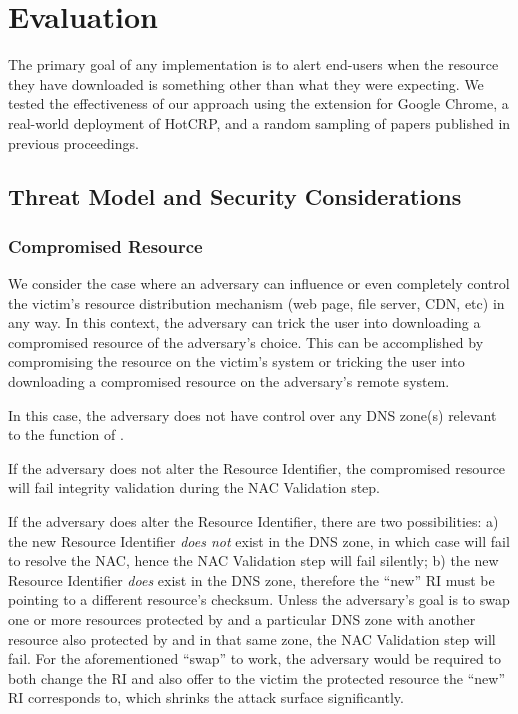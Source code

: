 \section{Evaluation} \label{sec:evaluation}

The primary goal of any \SYSTEM{} implementation is to alert end-users when the
resource they have downloaded is something other than what they were expecting.
We tested the effectiveness of our approach using the \SYSTEM{} extension for
Google Chrome, a real-world deployment of HotCRP, and a random sampling of
papers published in previous \CONFERENCE{} proceedings.

\subsection{Threat Model and Security Considerations}

\subsubsection{Compromised Resource}

We consider the case where an adversary can influence or even completely control
the victim's resource distribution mechanism (web page, file server, CDN, etc)
in any way. In this context, the adversary can trick the user into downloading a
compromised resource of the adversary's choice. This can be accomplished by
compromising the resource on the victim's system or tricking the user into
downloading a compromised resource on the adversary's remote system.

In this case, the adversary does not have control over any DNS zone(s) relevant
to the function of \SYSTEM{}.

If the adversary does not alter the Resource Identifier, the compromised
resource will fail integrity validation during the NAC Validation step.

If the adversary does alter the Resource Identifier, there are two
possibilities: a) the new Resource Identifier \textit{does not} exist in the DNS
zone, in which case \SYSTEM{} will fail to resolve the NAC, hence the NAC
Validation step will fail silently; b) the new Resource Identifier \textit{does}
exist in the DNS zone, therefore the ``new'' RI must be pointing to a different
resource's checksum. Unless the adversary's goal is to swap one or more resources
protected by \SYSTEM{} and a particular DNS zone with another resource also
protected by \SYSTEM{} and in that same zone, the NAC Validation step will fail.
For the aforementioned ``swap'' to work, the adversary would be required to both
change the RI and also offer to the victim the \SYSTEM{} protected resource the
``new'' RI corresponds to, which shrinks the attack surface significantly.

